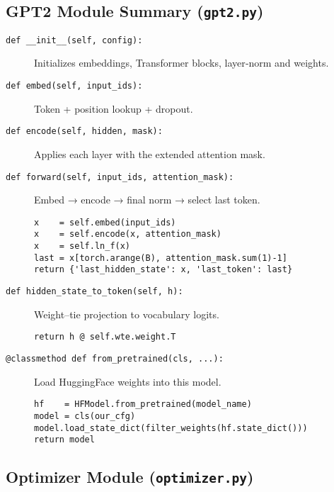 \documentclass{article}
\theoremstyle{definition}
\begin{document}
  
\subsection{GPT2 Module Summary (\texttt{gpt2.py})}

\begin{description}

  \item[\texttt{def \_\_init\_\_(self, config):}]  
    Initializes embeddings, Transformer blocks, layer‐norm and weights.

  \item[\texttt{def embed(self, input\_ids):}]  
    Token + position lookup + dropout.

  \item[\texttt{def encode(self, hidden, mask):}]  
    Applies each layer with the extended attention mask.

  \item[\texttt{def forward(self, input\_ids, attention\_mask):}]  
    Embed → encode → final norm → select last token.
\begin{verbatim}
x    = self.embed(input_ids)
x    = self.encode(x, attention_mask)
x    = self.ln_f(x)
last = x[torch.arange(B), attention_mask.sum(1)-1]
return {'last_hidden_state': x, 'last_token': last}
\end{verbatim}

  \item[\texttt{def hidden\_state\_to\_token(self, h):}]  
    Weight–tie projection to vocabulary logits.
\begin{verbatim}
return h @ self.wte.weight.T
\end{verbatim}

  \item[\texttt{@classmethod def from\_pretrained(cls, ...):}]  
    Load HuggingFace weights into this model.
\begin{verbatim}
hf    = HFModel.from_pretrained(model_name)
model = cls(our_cfg)
model.load_state_dict(filter_weights(hf.state_dict()))
return model
\end{verbatim}
\end{description}

\subsection{Optimizer Module (\texttt{optimizer.py})}
\end{document}
